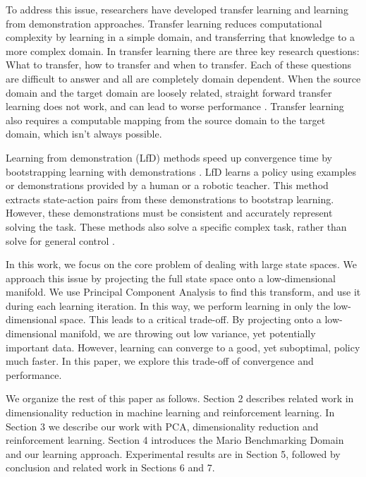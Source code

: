 \documentclass[twoside,11pt]{article}
\begin{document}
To address this issue, researchers have developed transfer learning \citep{5288526} and learning from demonstration \citep{Argall:2009:SRL:1523530.1524008} approaches. Transfer learning reduces computational complexity by learning in a simple domain, and transferring that knowledge to a more complex domain. In transfer learning there are three key research questions: What to transfer, how to transfer and when to transfer. Each of these questions are difficult to answer and all are completely domain dependent. When the source domain and the target domain are loosely related, straight forward transfer learning does not work, and can lead to worse performance \citep{5288526}. Transfer learning also requires a computable mapping from the source domain to the target domain, which isn't always possible.

Learning from demonstration (LfD) methods speed up convergence time by bootstrapping learning with  demonstrations \citep{Argall:2009:SRL:1523530.1524008}. LfD learns a policy using examples or demonstrations provided by a human or a robotic teacher. This method extracts state-action pairs from these demonstrations to bootstrap learning.  However, these demonstrations must be consistent and accurately represent solving the task. These methods also solve a specific complex task, rather than solve for general control \citep{Argall:2009:SRL:1523530.1524008}.

In this work, we focus on the core problem of dealing with large state spaces. We approach this issue by projecting the full state space onto a low-dimensional manifold. We use Principal Component Analysis to find this transform, and use it during each learning iteration. In this way, we perform learning in only the low-dimensional space. This leads to a critical trade-off. By projecting onto a low-dimensional manifold, we are throwing out low variance, yet potentially important data. However, learning can converge to a good, yet suboptimal, policy much faster. In this paper, we explore this trade-off of convergence and performance.

We organize the rest of this paper as follows. Section 2 describes related work in dimensionality reduction in machine learning and reinforcement learning. In Section 3 we describe our work with PCA, dimensionality reduction and reinforcement learning. Section 4 introduces the Mario Benchmarking Domain and our learning approach. Experimental results are in Section 5, followed by conclusion and related work in Sections 6 and 7.
\end{document}
